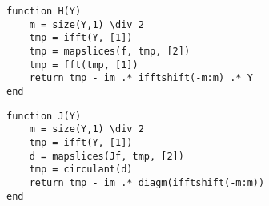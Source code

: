 \begin{lstlisting}
function H(Y)
	m = size(Y,1) \div 2
	tmp = ifft(Y, [1])
	tmp = mapslices(f, tmp, [2])
	tmp = fft(tmp, [1])
	return tmp - im .* ifftshift(-m:m) .* Y
end
\end{lstlisting}


\begin{lstlisting}
function J(Y)
	m = size(Y,1) \div 2
	tmp = ifft(Y, [1])
	d = mapslices(Jf, tmp, [2])
	tmp = circulant(d)
	return tmp - im .* diagm(ifftshift(-m:m))
end
\end{lstlisting}